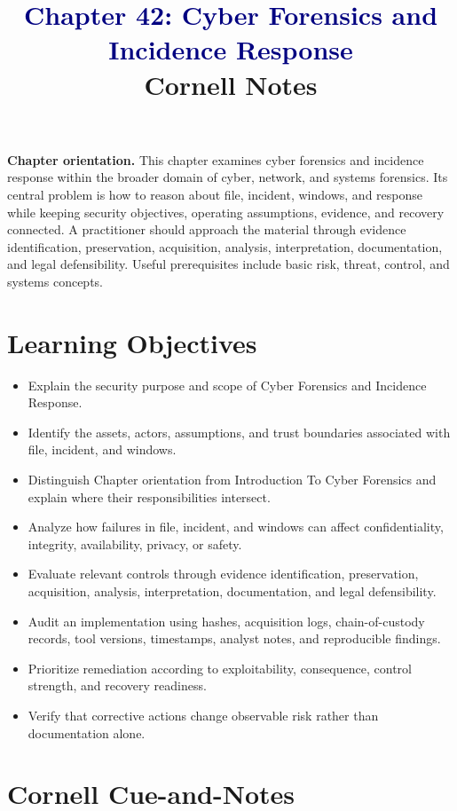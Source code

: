 \documentclass[11pt]{article}
\title{\textcolor{Navy}{Chapter 42: Cyber Forensics and Incidence Response}\\[2mm]\large Cornell Notes}
\author{}
\date{}
\begin{document}
\maketitle
\thispagestyle{fancy}
\vspace{-1.5em}
\begin{orientationbox}
\textbf{Chapter orientation.} This chapter examines cyber forensics and incidence response within the broader domain of cyber, network, and systems forensics. Its central problem is how to reason about file, incident, windows, and response while keeping security objectives, operating assumptions, evidence, and recovery connected. A practitioner should approach the material through evidence identification, preservation, acquisition, analysis, interpretation, documentation, and legal defensibility. Useful prerequisites include basic risk, threat, control, and systems concepts.
\end{orientationbox}
\section*{Learning Objectives}
\begin{itemize}
\item Explain the security purpose and scope of Cyber Forensics and Incidence Response.
\item Identify the assets, actors, assumptions, and trust boundaries associated with file, incident, and windows.
\item Distinguish Chapter orientation from Introduction To Cyber Forensics and explain where their responsibilities intersect.
\item Analyze how failures in file, incident, and windows can affect confidentiality, integrity, availability, privacy, or safety.
\item Evaluate relevant controls through evidence identification, preservation, acquisition, analysis, interpretation, documentation, and legal defensibility.
\item Audit an implementation using hashes, acquisition logs, chain-of-custody records, tool versions, timestamps, analyst notes, and reproducible findings.
\item Prioritize remediation according to exploitability, consequence, control strength, and recovery readiness.
\item Verify that corrective actions change observable risk rather than documentation alone.
\end{itemize}
\section*{Cornell Cue-and-Notes}
\end{document}
